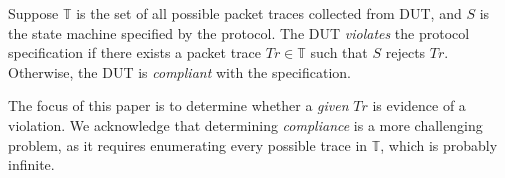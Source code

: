 \begin{definition}
  Suppose $\mathbb{T}$ is the set of all possible packet traces collected from
  DUT, and $S$ is the state machine specified by the protocol. The DUT
  \textit{violates} the protocol specification if there exists a
  packet trace $Tr \in \mathbb{T}$ such that $S$ rejects $Tr$.
  Otherwise, the DUT is \textit{compliant} with the specification.
\end{definition}

The focus of this paper is to determine whether a \textit{given} $Tr$ is
evidence of a violation.
%
We acknowledge that determining \textit{compliance} is a more challenging
problem, as it requires enumerating every possible trace in $\mathbb{T}$, which
is probably infinite.
